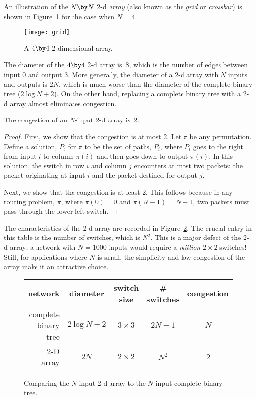 An illustration of the $N \by N$ 2-d \emph{array} (also known as the
\emph{grid} or \emph{crossbar}) is shown in Figure~\ref{fig:6EL} for
the case when $N = 4$.

\begin{figure}

\texttt{[image: grid]}

\caption{A $4 \by 4$ 2-dimensional array.}

\label{fig:6EL}

\end{figure}

The diameter of the $4 \by 4$ 2-d array is~8, which is the number of
edges between input 0 and output 3.  More generally, the diameter of a
2-d array with $N$ inputs and outputs is $2N$, which is much worse
than the diameter of the complete binary tree ($2 \log N + 2$).  On
the other hand, replacing a complete binary tree with a 2-d array
almost eliminates congestion.

\begin{theorem}
The congestion of an $N$-input 2-d array is~2.
\end{theorem}

\begin{proof}
First, we show that the congestion is at most 2.  Let $\pi$ be any
permutation.  Define a solution, $P$, for $\pi$ to be the set of
paths, $P_i$, where $P_i$ goes to the right from input $i$ to column
$\pi(i)$ and then goes down to output $\pi(i)$.  In this solution, the
switch in row $i$ and column $j$ encounters at most two packets: the
packet originating at input $i$ and the packet destined for output
$j$.

Next, we show that the congestion is at least 2.  This follows because in
any routing problem, $\pi$, where $\pi(0) = 0$ and $\pi(N-1) =
N-1$, two packets must pass through the lower left switch.
\end{proof}

The characteristics of the 2-d array are recorded in
Figure~\ref{fig:6EM}. The crucial entry in this table is the number of
switches, which is $N^2$.  This is a major defect of the 2-d array;
a network with $N = 1000$ inputs would require a \emph{million} $2
\times 2$ switches!  Still, for applications where $N$ is small, the
simplicity and low congestion of the array make it an attractive
choice.


\begin{figure}

\begin{tabular}{r|c|c|c|c}
\textbf{network} &
\textbf{diameter} &
\textbf{switch size} &
\textbf{\# switches} &
\textbf{congestion} \\ \hline
complete binary tree & $2 \log N + 2$ & $3 \times 3$ & $2N - 1$ & $N$ \\
2-D array            & $2 N$          & $2 \times 2$ & $N^2$    & 2
\end{tabular}

\caption{Comparing the $N$-input 2-d array to the $N$-input
  complete binary tree.}

\label{fig:6EM}

\end{figure}

